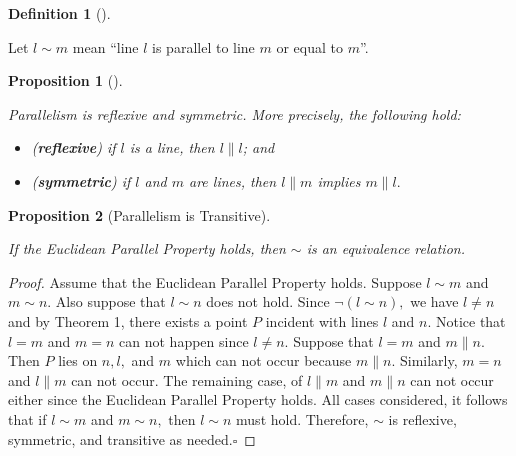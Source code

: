 \documentclass[
  twoside,
  12pt,
  letterpaper,
  fleqn]{article}
\providecommand{\tightlist}{%
  \setlength{\itemsep}{0pt}\setlength{\parskip}{0pt}}\usepackage{longtable,booktabs,array}
\theoremstyle{definition}
\newtheorem{definition}{Definition}[section]
\theoremstyle{definition}
\theoremstyle{plain}
\newtheorem{proposition}{Proposition}[section]
\theoremstyle{plain}
\theoremstyle{remark}
\begin{document}
\begin{definition}[]\protect\hypertarget{def-parallel}{}\label{def-parallel}

Let \(l\sim m\) mean ``line \(l\) is parallel to line \(m\) or equal to
\(m\)''.

\end{definition}

\begin{proposition}[]\protect\hypertarget{prp-one}{}\label{prp-one}

Parallelism is reflexive and symmetric. More precisely, the following
hold:

\begin{itemize}
\tightlist
\item
  (\textbf{reflexive}) if \(l\) is a line, then \(l \parallel l\); and
\item
  (\textbf{symmetric}) if \(l\) and \(m\) are lines, then
  \(l \parallel m\) implies \(m \parallel l.\)
\end{itemize}

\end{proposition}

\begin{proposition}[Parallelism is
Transitive]\protect\hypertarget{prp-two}{}\label{prp-two}

If the Euclidean Parallel Property holds, then \(\sim\) is an
equivalence relation.

\end{proposition}

\begin{proof}

Assume that the Euclidean Parallel Property holds. Suppose \(l\sim m\)
and \(m\sim n.\) Also suppose that \(l\sim n\) does not hold. Since
\(\neg(l\sim n),\) we have \(l\neq n\) and by Theorem 1, there exists a
point \(P\) incident with lines \(l\) and \(n.\) Notice that \(l=m\) and
\(m=n\) can not happen since \(l\neq n.\) Suppose that \(l=m\) and
\(m \parallel n.\) Then \(P\) lies on \(n, l,\) and \(m\) which can not
occur because \(m \parallel n.\) Similarly, \(m=n\) and
\(l \parallel m\) can not occur. The remaining case, of
\(l \parallel m\) and \(m \parallel n\) can not occur either since the
Euclidean Parallel Property holds. All cases considered, it follows that
if \(l\sim m\) and \(m\sim n,\) then \(l\sim n\) must hold. Therefore,
\(\sim\) is reflexive, symmetric, and transitive as needed.\(\square\)

\end{proof}
\end{document}
